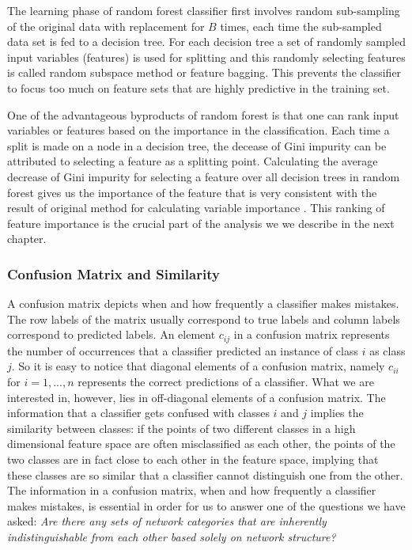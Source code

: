 \documentclass[..]{revtex4}
\begin{document}
The learning phase of random forest classifier first involves random sub-sampling of the original data with replacement for $B$ times, each time the sub-sampled data set is fed to a decision tree. For each decision tree a set of randomly sampled input variables (features) is used for splitting and this randomly selecting features is called random subspace method or feature bagging. This prevents the classifier to focus too much on feature sets that are highly predictive in the training set. 

One of the advantageous byproducts of random forest is that one can rank input variables or features based on the importance in the classification. Each time a split is made on a node in a decision tree, the decease of Gini impurity can be attributed to selecting a feature as a splitting point.  Calculating the average decrease of Gini impurity for selecting a feature over all decision trees in random forest gives us the importance of the feature that is very consistent with the result of original method for calculating variable importance \cite{RandomForest,RandomForestOnline}. This ranking of feature importance is the crucial part of the analysis we we describe in the next chapter.


		\subsubsection{Confusion Matrix and Similarity}
	A confusion matrix depicts when and how frequently a classifier makes mistakes. The row labels of the matrix usually correspond to  true labels and column labels correspond to predicted labels. An element $c_{ij}$ in a confusion matrix represents the number of occurrences that a classifier predicted an instance of class $i$ as class $j$. So it is easy to notice that diagonal elements of a confusion matrix, namely $c_{ii}$ for $i = 1,...,n$ represents the correct predictions of a classifier. What we are interested in, however, lies in off-diagonal elements of a confusion matrix. The information that a classifier gets confused with classes $i$ and $j$ implies the similarity between classes: if the points of two different classes in a high dimensional feature space are often misclassified as each other, the points of the two classes are in fact close to each other in the feature space, implying that these classes are so similar that a classifier cannot distinguish one from the other. The information in a confusion matrix, when and how frequently a classifier makes mistakes, is essential in order for us to answer one of the questions we have asked: \textit{Are there any sets of network categories that are inherently indistinguishable from each other based solely on network structure?}
\end{document}
